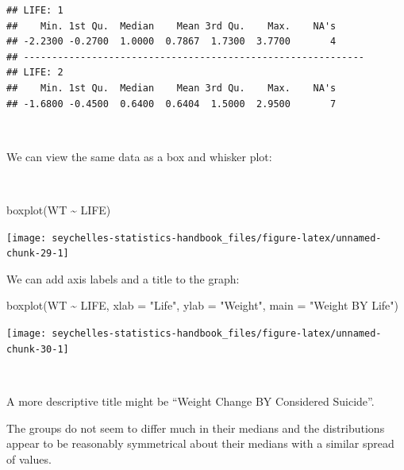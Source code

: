 \documentclass[
  12pt,
]{book}
\newenvironment{Shaded}{\begin{snugshade}}{\end{snugshade}}
\newcommand{\AttributeTok}[1]{\textcolor[rgb]{0.77,0.63,0.00}{#1}}
\newcommand{\FunctionTok}[1]{\textcolor[rgb]{0.00,0.00,0.00}{#1}}
\newcommand{\NormalTok}[1]{#1}
\newcommand{\SpecialCharTok}[1]{\textcolor[rgb]{0.00,0.00,0.00}{#1}}
\newcommand{\StringTok}[1]{\textcolor[rgb]{0.31,0.60,0.02}{#1}}
\begin{document}
\begin{verbatim}
## LIFE: 1
##    Min. 1st Qu.  Median    Mean 3rd Qu.    Max.    NA's 
## -2.2300 -0.2700  1.0000  0.7867  1.7300  3.7700       4 
## ------------------------------------------------------------ 
## LIFE: 2
##    Min. 1st Qu.  Median    Mean 3rd Qu.    Max.    NA's 
## -1.6800 -0.4500  0.6400  0.6404  1.5000  2.9500       7
\end{verbatim}

~

We can view the same data as a box and whisker plot:

~

\begin{Shaded}
\begin{Highlighting}[]
\FunctionTok{boxplot}\NormalTok{(WT }\SpecialCharTok{\textasciitilde{}}\NormalTok{ LIFE)}
\end{Highlighting}
\end{Shaded}

\begin{center}\texttt{[image: seychelles-statistics-handbook\_files/figure-latex/unnamed-chunk-29-1]} \end{center}

\newpage

We can add axis labels and a title to the graph:

\begin{Shaded}
\begin{Highlighting}[]
\FunctionTok{boxplot}\NormalTok{(WT }\SpecialCharTok{\textasciitilde{}}\NormalTok{ LIFE,}
        \AttributeTok{xlab =} \StringTok{"Life"}\NormalTok{,}
        \AttributeTok{ylab =} \StringTok{"Weight"}\NormalTok{,}
        \AttributeTok{main =} \StringTok{"Weight BY Life"}\NormalTok{)}
\end{Highlighting}
\end{Shaded}

\begin{center}\texttt{[image: seychelles-statistics-handbook\_files/figure-latex/unnamed-chunk-30-1]} \end{center}

~

A more descriptive title might be ``Weight Change BY Considered Suicide''.

The groups do not seem to differ much in their medians and the distributions appear to be reasonably symmetrical about their medians with a similar spread of values.

\newpage
\end{document}
